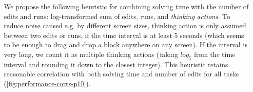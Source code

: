 We propose the following heuristic for combining solving time with the number of edits and runs: log-transformed sum of edits, runs, and \emph{thinking actions}.
To reduce noise caused e.g. by different screen sizes,
thinking action is only assumed between two edits
or runs, if the time interval is at least 5 seconds (which seems to be enough
to drag and drop a block anywhere on any screen). If the interval is very long,
we count it as multiple thinking actions (taking $log_5$ from the time interval
and rounding it down to the closest integer).
This heuristic retains reasonable correlation with both solving time
and number of edits for all tasks (\cref{fig:performance-corrs-p10}).



